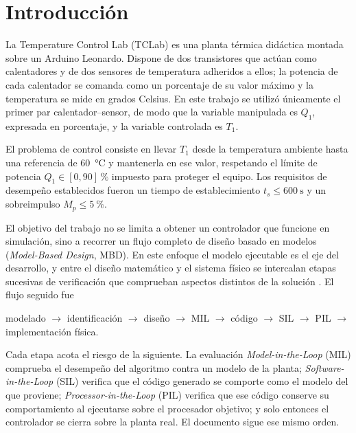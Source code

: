 \section{Introducción}

La Temperature Control Lab (TCLab) es una planta térmica didáctica montada sobre un Arduino
Leonardo. Dispone de dos transistores que actúan como calentadores y de dos sensores de temperatura
adheridos a ellos; la potencia de cada calentador se comanda como un porcentaje de su valor máximo
y la temperatura se mide en grados Celsius. En este trabajo se utilizó únicamente el primer par
calentador--sensor, de modo que la variable manipulada es $Q_1$, expresada en porcentaje, y la
variable controlada es $T_1$.

El problema de control consiste en llevar $T_1$ desde la temperatura ambiente hasta una referencia
de \SI{60}{\celsius} y mantenerla en ese valor, respetando el límite de potencia
$Q_1 \in [0, 90]\,\si{\percent}$ impuesto para proteger el equipo. Los requisitos de desempeño
establecidos fueron un tiempo de establecimiento $t_s \leq \SI{600}{\second}$ y un sobreimpulso
$M_p \leq \SI{5}{\percent}$.

El objetivo del trabajo no se limita a obtener un controlador que funcione en simulación, sino a
recorrer un flujo completo de diseño basado en modelos (\emph{Model-Based Design}, MBD). En este
enfoque el modelo ejecutable es el eje del desarrollo, y entre el diseño matemático y el sistema
físico se intercalan etapas sucesivas de verificación que comprueban aspectos distintos de la
solución \cite{mw_hil}. El flujo seguido fue

\begin{center}
modelado $\rightarrow$ identificación $\rightarrow$ diseño $\rightarrow$ MIL $\rightarrow$
código $\rightarrow$ SIL $\rightarrow$ PIL $\rightarrow$ implementación física.
\end{center}

Cada etapa acota el riesgo de la siguiente. La evaluación \emph{Model-in-the-Loop} (MIL) comprueba
el desempeño del algoritmo contra un modelo de la planta; \emph{Software-in-the-Loop} (SIL)
verifica que el código generado se comporte como el modelo del que proviene;
\emph{Processor-in-the-Loop} (PIL) verifica que ese código conserve su comportamiento al ejecutarse
sobre el procesador objetivo; y solo entonces el controlador se cierra sobre la planta real. El
documento sigue ese mismo orden.
